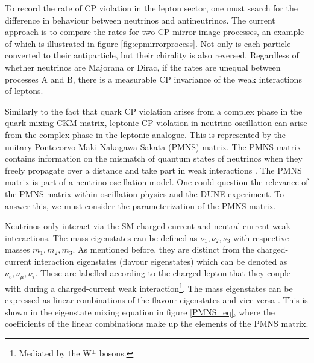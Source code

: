 \documentclass[10pt]{article}
\begin{document}
To record the rate of CP violation in the lepton sector, one must search for the difference in behaviour between neutrinos and antineutrinos. The current approach is to compare the rates for two CP mirror-image processes, an example of which is illustrated in figure \ref{fig:cpmirrorprocess}. Not only is each particle converted to their antiparticle, but their chirality is also reversed.  Regardless of whether neutrinos are Majorana or Dirac, if the rates are unequal between processes A and B, there is a measurable CP invariance of the weak interactions of leptons.

Similarly to the fact that quark CP violation arises from a complex phase in the quark-mixing CKM matrix, leptonic CP violation in neutrino oscillation can arise from the complex phase in the leptonic analogue. This is represented by the unitary Pontecorvo-Maki-Nakagawa-Sakata (PMNS) matrix. The PMNS matrix contains information on the mismatch of quantum states of neutrinos when they freely propagate over a distance and take part in weak interactions \cite{maki1962remarks}. The PMNS matrix is part of a neutrino oscillation model. One could question  the relevance of the PMNS matrix within oscillation physics and the DUNE experiment. To answer this, we must consider the parameterization of the PMNS matrix.

Neutrinos only interact via the SM charged-current and neutral-current weak interactions. The mass eigenstates can be defined as $\nu_1, \nu_2, \nu_3$ with respective masses $m_1, m_2, m_3$. As mentioned before, they are distinct from the charged-current interaction eigenstates (flavour eigenstates) which can be denoted as $\nu_e, \nu_{\mu}, \nu_{\tau}$. These are labelled according to the charged-lepton that they couple with during a charged-current weak interaction\footnote{Mediated by the W$^{\pm}$ bosons.}. The mass eigenstates can be expressed as linear combinations of the flavour eigenstates and vice versa \cite{abi2020deep}. This is shown in the eigenstate mixing equation in figure \ref{PMNS_eq}, where the coefficients of the linear combinations make up the elements of the PMNS matrix.
\end{document}
